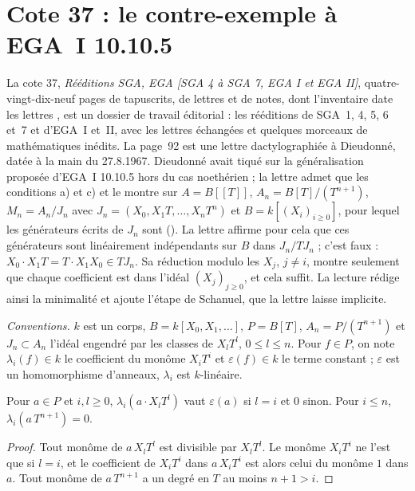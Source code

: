 \section[Cote 37 : le contre-exemple à EGA I 10.10.5]{Cote 37 : le contre-exemple à EGA~I 10.10.5\protect{}}\label{sec:37}

La cote 37, \emph{Rééditions SGA, EGA [SGA 4 à SGA 7, EGA I et EGA II]}, quatre-vingt-dix-neuf pages de tapuscrits, de lettres et de notes, dont l'inventaire date les lettres , est un dossier de travail éditorial : les rééditions de SGA~1, 4, 5, 6 et~7 et d'EGA~I et~II, avec les lettres échangées et quelques morceaux de mathématiques inédits. La page~92 est une lettre dactylographiée à Dieudonné, datée à la main du 27.8.1967. Dieudonné avait tiqué sur la généralisation proposée d'EGA~I 10.10.5 hors du cas noethérien ; la lettre admet que les conditions a) et c)  et le montre sur $A = B[[T]]$, $A_n = B[T]/(T^{n+1})$, $M_n = A_n/J_n$ avec $J_n = (X_0, X_1T, \ldots, X_nT^n)$ et $B = k[(X_i)_{i \geq 0}]$, pour lequel les générateurs écrits de $J_n$ sont  (). La lettre affirme pour cela que ces générateurs sont linéairement indépendants sur $B$ dans $J_n/TJ_n$ ; c'est faux : $X_0 \cdot X_1T = T \cdot X_1X_0 \in TJ_n$. Sa réduction modulo les $X_j$, $j \neq i$, montre seulement que chaque coefficient est dans l'idéal $(X_j)_{j \geq 0}$, et cela suffit. La lecture rédige ainsi la minimalité et ajoute l'étape de Schanuel, que la lettre laisse implicite.

\noindent\emph{Conventions.} $k$ est un corps, $B = k[X_0, X_1, \ldots]$, $P = B[T]$, $A_n = P/(T^{n+1})$ et $J_n \subset A_n$ l'idéal engendré par les classes de $X_lT^l$, $0 \leq l \leq n$. Pour $f \in P$, on note $\lambda_i(f) \in k$ le coefficient du monôme $X_iT^i$ et $\varepsilon(f) \in k$ le terme constant ; $\varepsilon$ est un homomorphisme d'anneaux, $\lambda_i$ est $k$-linéaire.

\begin{lemme}\label{lem:37-lambda}
Pour $a \in P$ et $i, l \geq 0$, $\lambda_i(a \cdot X_lT^l)$ vaut $\varepsilon(a)$ si $l = i$ et $0$ sinon. Pour $i \leq n$, $\lambda_i(a\,T^{n+1}) = 0$.
\end{lemme}

\begin{proof}
Tout monôme de $a\,X_lT^l$ est divisible par $X_lT^l$. Le monôme $X_iT^i$ ne l'est que si $l = i$, et le coefficient de $X_iT^i$ dans $a\,X_iT^i$ est alors celui du monôme $1$ dans $a$. Tout monôme de $a\,T^{n+1}$ a un degré en $T$ au moins $n + 1 > i$.
\end{proof}

